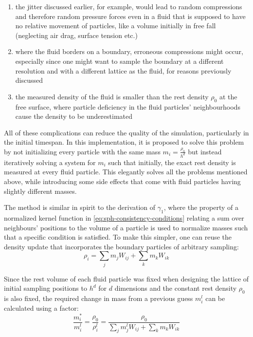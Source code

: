 \begin{enumerate}
  \item the jitter discussed earlier, for example, would lead to random compressions and therefore random pressure forces even in a fluid that is supposed to have no relative movement of particles, like a volume initially in free fall (neglecting air drag, surface tension etc.)
  \item where the fluid borders on a boundary, erroneous compressions might occur, especially since one might want to sample the boundary at a different resolution and with a different lattice as the fluid, for reasons previously discussed
  \item the measured density of the fluid is smaller than the rest density $\rho_0$ at the free surface, where particle deficiency in the fluid particles' neighbourhoods cause the density to be underestimated
\end{enumerate}

All of these complications can reduce the quality of the simulation, particularly in the initial timespan. In this implementation, it is proposed to solve this problem by not initializing every particle with the same mass $m_i = \frac{\rho_0}{h^d}$ but instead iteratively solving a system for $m_i$ such that initially, the exact rest density is measured at every fluid particle. This elegantly solves all the problems mentioned above, while introducing some side effects that come with fluid particles having slightly different masses.

The method is similar in spirit to the derivation of $\gamma_1$, where the property of a normalized kernel function in \autoref{eq:sph-consistency-conditions} relating a sum over neighbours' positions to the volume of a particle is used to normalize masses such that a specific condition is satisfied. To make this simpler, one can reuse the density update that incorporates the boundary particles of arbitrary sampling:
\begin{equation}
  \rho_i = \sum_j m_j W_{ij} + \sum_k m_k W_{ik}
\end{equation}

Since the rest volume of each fluid particle was fixed when designing the lattice of initial sampling positions to $h^d$ for $d$ dimensions and the constant rest density $\rho_0$ is also fixed, the required change in mass from a previous guess $m_i^l$ can be calculated using a factor:
\begin{equation}
  \frac{m_i^*}{m_i^l} = \frac{\rho_0}{\rho_i^l} = \frac{\rho_0}{\sum_j m_j^l W_{ij} + \sum_k m_k W_{ik}}
\end{equation}

